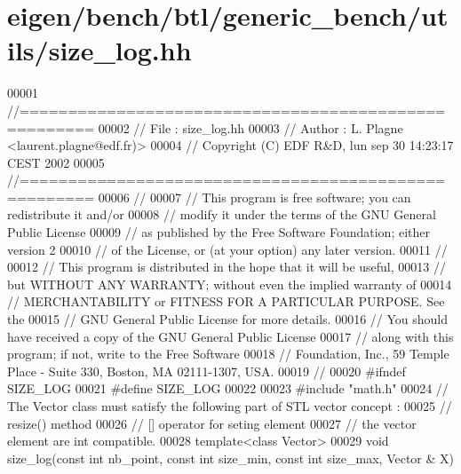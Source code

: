 \hypertarget{eigen_2bench_2btl_2generic__bench_2utils_2size__log_8hh_source}{}\section{eigen/bench/btl/generic\+\_\+bench/utils/size\+\_\+log.hh}
\label{eigen_2bench_2btl_2generic__bench_2utils_2size__log_8hh_source}

\begin{DoxyCode}
00001 \textcolor{comment}{//=====================================================}
00002 \textcolor{comment}{// File   :  size\_log.hh}
00003 \textcolor{comment}{// Author :  L. Plagne <laurent.plagne@edf.fr)>        }
00004 \textcolor{comment}{// Copyright (C) EDF R&D,  lun sep 30 14:23:17 CEST 2002}
00005 \textcolor{comment}{//=====================================================}
00006 \textcolor{comment}{// }
00007 \textcolor{comment}{// This program is free software; you can redistribute it and/or}
00008 \textcolor{comment}{// modify it under the terms of the GNU General Public License}
00009 \textcolor{comment}{// as published by the Free Software Foundation; either version 2}
00010 \textcolor{comment}{// of the License, or (at your option) any later version.}
00011 \textcolor{comment}{// }
00012 \textcolor{comment}{// This program is distributed in the hope that it will be useful,}
00013 \textcolor{comment}{// but WITHOUT ANY WARRANTY; without even the implied warranty of}
00014 \textcolor{comment}{// MERCHANTABILITY or FITNESS FOR A PARTICULAR PURPOSE.  See the}
00015 \textcolor{comment}{// GNU General Public License for more details.}
00016 \textcolor{comment}{// You should have received a copy of the GNU General Public License}
00017 \textcolor{comment}{// along with this program; if not, write to the Free Software}
00018 \textcolor{comment}{// Foundation, Inc., 59 Temple Place - Suite 330, Boston, MA  02111-1307, USA.}
00019 \textcolor{comment}{// }
00020 \textcolor{preprocessor}{#ifndef SIZE\_LOG}
00021 \textcolor{preprocessor}{#define SIZE\_LOG}
00022 
00023 \textcolor{preprocessor}{#include "math.h"}
00024 \textcolor{comment}{// The Vector class must satisfy the following part of STL vector concept :}
00025 \textcolor{comment}{//            resize() method}
00026 \textcolor{comment}{//            [] operator for seting element}
00027 \textcolor{comment}{// the vector element are int compatible.}
00028 \textcolor{keyword}{template}<\textcolor{keyword}{class} Vector>
00029 \textcolor{keywordtype}{void} size\_log(\textcolor{keyword}{const} \textcolor{keywordtype}{int} nb\_point, \textcolor{keyword}{const} \textcolor{keywordtype}{int} size\_min, \textcolor{keyword}{const} \textcolor{keywordtype}{int} size\_max, Vector & X)

\end{DoxyCode}
